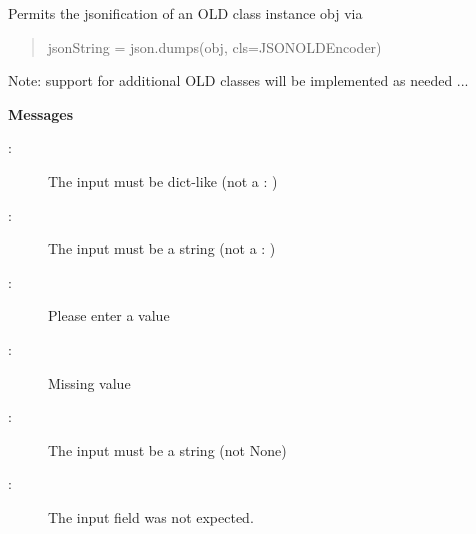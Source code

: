 \documentclass[letterpaper,10pt,english]{sphinxmanual}
\begin{document}

\begin{fulllineitems}
\label{api:old.lib.utils.JSONOLDEncoder}
Permits the jsonification of an OLD class instance obj via
\begin{quote}

jsonString = json.dumps(obj, cls=JSONOLDEncoder)
\end{quote}

Note: support for additional OLD classes will be implemented as needed ...

\end{fulllineitems}


\begin{fulllineitems}
\label{api:old.lib.utils.OrderBySchema}
\textbf{Messages}
\begin{description}
\item[{:}] \leavevmode
The input must be dict-like (not a : )

\item[{:}] \leavevmode
The input must be a string (not a : )

\item[{:}] \leavevmode
Please enter a value

\item[{:}] \leavevmode
Missing value

\item[{:}] \leavevmode
The input must be a string (not None)

\item[{:}] \leavevmode
The input field  was not expected.

\end{description}

\end{fulllineitems}
\end{document}
